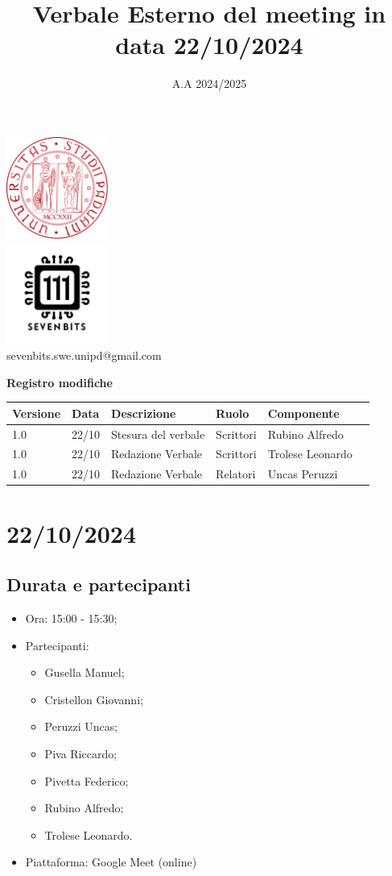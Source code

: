 \documentclass[12pt]{article}
\title{Verbale Esterno del meeting in data 22/10/2024}
\date{A.A 2024/2025}
\begin{document}
\maketitle
\center 
\includegraphics[width=0.25\textwidth]{LogoUnipd}\\
\includegraphics[width=0.25\textwidth]{Sevenbitslogo}\\
sevenbits.swe.unipd@gmail.com\\
\vspace{2mm}

\textbf{Registro modifiche}\\
\vspace{2mm}
\begin{tabular}{|l|l|l|l|l|l|}
\hline
\textbf{Versione} & \textbf{Data} & \textbf{Descrizione} & \textbf{Ruolo} & \textbf{Componente} \\
\hline
1.0 & 22/10 & Stesura del verbale & Scrittori & Rubino Alfredo\\
\hline
1.0 & 22/10 & Redazione Verbale & Scrittori & Trolese Leonardo\\
\hline
1.0 & 22/10 & Redazione Verbale & Relatori & Uncas Peruzzi\\
\hline
\end{tabular}

\raggedright
\tableofcontents
\newpage
\section{22/10/2024}
\subsection{Durata e partecipanti}
\begin{itemize}
\item Ora: 15:00 - 15:30;
\item Partecipanti: 	
	\begin{itemize}
	\item Gusella Manuel;
	\item Cristellon Giovanni;
	\item Peruzzi Uncas;
	\item Piva Riccardo;
	\item Pivetta Federico;
	\item Rubino Alfredo;
	\item Trolese Leonardo.
	\end{itemize}
\item Piattaforma: Google Meet (online)
\end{itemize}
\end{document}
